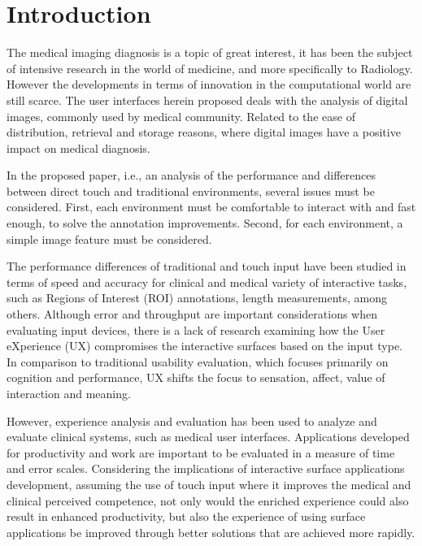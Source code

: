 \documentclass{sigchi}
\begin{document}
\section{Introduction}

The medical imaging diagnosis is a topic of great interest, it has been the subject of intensive research in the world of medicine, and more specifically to Radiology. However the developments in terms of innovation in the computational world are still scarce. The user interfaces herein proposed deals with the analysis of digital images, commonly used by medical community. Related to the ease of distribution, retrieval and storage reasons, where digital images have a positive impact on medical diagnosis.

In the proposed paper, i.e., an analysis of the performance and differences between direct touch and traditional environments, several issues must be considered. First, each environment must be comfortable to interact with and fast enough, to solve the annotation improvements. Second, for each environment, a simple image feature must be considered.

\clearpage

The performance differences of traditional and touch input have been studied in terms of speed and accuracy for clinical and medical variety of interactive tasks, such as Regions of Interest (ROI) annotations, length measurements, among others. Although error and throughput are important considerations when evaluating input devices, there is a lack of research examining how the User eXperience (UX) compromises the interactive surfaces based on the input type. In comparison to traditional usability evaluation, which focuses primarily on cognition and performance, UX shifts the focus to sensation, affect, value of interaction and meaning.

However, experience analysis and evaluation has been used to analyze and evaluate clinical systems, such as \cite{crisan2013optimization} medical user interfaces. Applications developed for productivity and work are important to be evaluated in a measure of time and error scales. Considering the implications of interactive surface applications development, assuming the use of touch input where it improves the medical and clinical perceived competence, not only would the enriched experience could also result in enhanced productivity, but also the experience of using surface applications be improved through better solutions that are achieved more rapidly.
\end{document}
